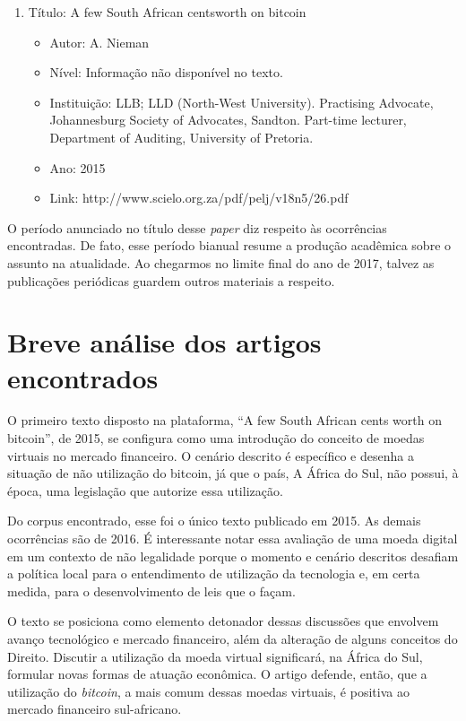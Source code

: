 \documentclass[12pt]{article}
\begin{document}
\begin{enumerate}[I]
\item Título: A few South African centsworth on bitcoin
\begin{itemize}

\item Autor: 
A. Nieman
\item Nível: Informação não disponível no texto.
\item Instituição: LLB; LLD (North-West University). Practising Advocate, Johannesburg Society of Advocates, Sandton. Part-time lecturer, Department of Auditing, University of Pretoria.
\item Ano: 
2015
\item Link: 
http://www.scielo.org.za/pdf/pelj/v18n5/26.pdf
\end{itemize}

\end{enumerate}

O período anunciado no título desse \textit{paper} diz respeito às ocorrências encontradas. De fato, esse período bianual resume a produção acadêmica sobre o assunto na atualidade. Ao chegarmos no limite final do ano de 2017, talvez as publicações periódicas guardem outros materiais a respeito.

\section{Breve análise dos artigos encontrados}

O primeiro texto disposto na plataforma, “A few South African cents worth on bitcoin”, de 2015, se configura como uma introdução do conceito de moedas virtuais no mercado financeiro. O cenário descrito é específico e desenha a situação de não utilização do bitcoin, já que o país, A África do Sul, não possui, à época, uma legislação que autorize essa utilização.

Do corpus encontrado, esse foi o único texto publicado em 2015. As demais ocorrências são de 2016. É interessante notar essa avaliação de uma moeda digital em um contexto de não legalidade porque o momento e cenário descritos desafiam a política local para o entendimento de utilização da tecnologia e, em certa medida, para o desenvolvimento de leis que o façam.

O texto se posiciona como elemento detonador dessas discussões que envolvem avanço tecnológico e mercado financeiro, além da alteração de alguns conceitos do Direito. Discutir a utilização da moeda virtual significará, na África do Sul, formular novas formas de atuação econômica. O artigo defende, então, que a utilização do \textit{bitcoin}, a mais comum dessas moedas virtuais, é positiva ao mercado financeiro sul-africano.
\end{document}
